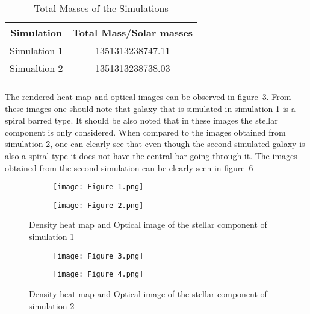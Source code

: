\documentclass[12pt, a4paper]{article}
\begin{document}
\begin{longtable}[c]{cc}
  Simulation   & Total Mass/Solar masses \\ \hline \hline
  \endhead

  Simulation 1 & 1351313238747.11        \\ \hline
  Simualtion 2 & 1351313238738.03        \\
  \caption{Total Masses of the Simulations}\label{tab:table_1}
\end{longtable}

The rendered heat map and optical images can be observed in figure~\ref{fig:Combined_simulation_1}. From these images one should note that galaxy that is simulated in simulation 1 is a spiral barred type. It should be also noted that in these images the stellar component is only considered. When compared to the images obtained from simulation 2, one can clearly see that even though the second simulated galaxy is also a spiral type it does not have the central bar going through it. The images obtained from the second simulation can be clearly seen in figure~\ref{fig:Combined_simulation_2}

\begin{figure}[H]
  \centering
  \begin{subfigure}{.5\textwidth}
    \centering
    \texttt{[image: Figure 1.png]}
    \label{fig:heat_map_simulation_1}
  \end{subfigure}%
  \begin{subfigure}{.5\textwidth}
    \centering
    \texttt{[image: Figure 2.png]}
    \label{fig:optical_simulation_1}
  \end{subfigure}
  \caption{Density heat map and Optical image of the stellar component of simulation 1}
  \label{fig:Combined_simulation_1}
\end{figure}

\begin{figure}[H]
  \centering
  \begin{subfigure}{.5\textwidth}
    \centering
    \texttt{[image: Figure 3.png]}
    \label{fig:heat_map_simulation_2}
  \end{subfigure}%
  \begin{subfigure}{.5\textwidth}
    \centering
    \texttt{[image: Figure 4.png]}
    \label{fig:optical_simulation_2}
  \end{subfigure}
  \caption{Density heat map and Optical image of the stellar component of simulation 2}
  \label{fig:Combined_simulation_2}
\end{figure}
\end{document}
